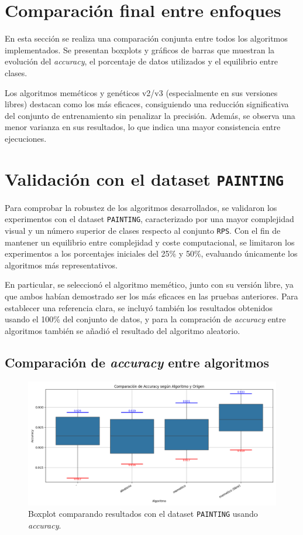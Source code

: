 \section{Comparación final entre enfoques}\label{sec:comparacion-final-enfoques}
En esta sección se realiza una comparación conjunta entre todos los algoritmos implementados.
Se presentan boxplots y gráficos de barras que muestran la evolución del \textit{accuracy}, el porcentaje de datos utilizados y el equilibrio entre clases.

Los algoritmos meméticos y genéticos v2/v3 (especialmente en sus versiones libres) destacan como los más eficaces, consiguiendo una reducción significativa del conjunto de entrenamiento sin penalizar la precisión.
Además, se observa una menor varianza en sus resultados, lo que indica una mayor consistencia entre ejecuciones.

\section{Validación con el dataset \texttt{PAINTING}}\label{sec:validacion-con-painting}
Para comprobar la robustez de los algoritmos desarrollados, se validaron los experimentos con el dataset \texttt{PAINTING},
caracterizado por una mayor complejidad visual y un número superior de clases respecto al conjunto \texttt{RPS}.
Con el fin de mantener un equilibrio entre complejidad y coste computacional, se limitaron los experimentos a los porcentajes iniciales del 25\% y 50\%,
evaluando únicamente los algoritmos más representativos.

En particular, se seleccionó el algoritmo memético, junto con su versión libre, ya que ambos habían demostrado ser los más eficaces en las pruebas anteriores.
Para establecer una referencia clara, se incluyó también los resultados obtenidos usando el 100\% del conjunto de datos, y para la compración de
\textit{accuracy} entre algoritmos también se añadió el resultado del algoritmo aleatorio.

\subsection{Comparación de \textit{accuracy} entre algoritmos}
\begin{figure}[H]
    \centering
    \includegraphics[width=1\textwidth]{imagenes/evaluaciones/painting/comparacion-por-algoritmo}
    \caption{Boxplot comparando resultados con el dataset \texttt{PAINTING} usando \textit{accuracy}.}
    \label{fig:comparacion-por-algoritmo}
\end{figure}

